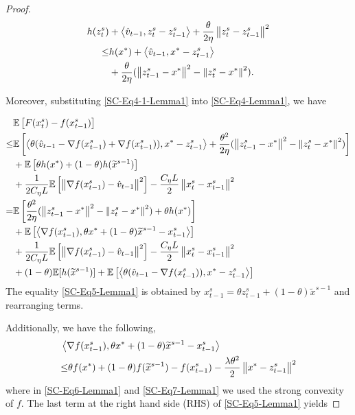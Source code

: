 \documentclass{article}
\newcommand*{\E}{\mathbb{E}}
\newcommand{\norm}[1]{\left\lVert#1\right\rVert}
\newcommand{\Iprod}[2]{\left\langle #1,#2\right\rangle}
\theoremstyle{definition}
\theoremstyle{remark}
\begin{document}
{\begin{proof}
\begin{align}
h(z_{t}^s) &+ \Iprod{\hat{v}_{t-1}}{z_{t}^s-z_{t-1}^s}+{\frac{\theta}{2\eta}}\norm{z_{t}^s-z_{t-1}^s}^2  \notag\\
\leq& h(x^*)+\Iprod{\hat{v}_{t-1}}{x^* - z_{t-1}^s}\notag\\
&+{\frac{\theta}{2\eta}}(\norm{z_{t-1}^s-x^*}^2-\norm{z_{t}^s-x^*}^2)\label{SC-Eq4-1-Lemma1}.  
\end{align}

Moreover, substituting \eqref{SC-Eq4-1-Lemma1} into  \eqref{SC-Eq4-Lemma1}, we have

\begin{align}
&\E\left[F(x_{t}^s) -f(x_{t-1}^s)\right]\notag\\
{\leq}&\E\left[\Iprod{\theta(\hat{v}_{t-1}-\nabla f(x_{t-1}^s)+\nabla f(x_{t-1}^s))}{x^* - z_{t-1}^s}+{\frac{\theta^2}{2\eta}}(\norm{z_{t-1}^s-x^*}^2-\norm{z_{t}^s-x^*}^2)\right]\notag\\
&+\E\left[\theta h(x^*)+(1-\theta) h(\widetilde{x}^{s-1})\right]\notag\\
&+\frac{1}{2C_{\eta} L}\E\left[\norm{\nabla f(x_{t-1}^s)-\hat{v}_{t-1}}^2\right]-\frac{C_{\eta} L}{2}\norm{x_{t}^s-x_{t-1}^s}^2\\
 =& \E\left[{\frac{ \theta^2}{2\eta}}(\norm{z_{t-1}^s-x^*}^2-\norm{z_{t}^s-x^*}^2)+\theta h(x^*)\right]\notag\\
&+\E\left[\Iprod{\nabla f(x_{t-1}^s)}{\theta x^*+(1-\theta)\widetilde{x}^{s-1}-{x}^{s}_{t-1}}\right]\notag\\
&+\frac{1}{2C_{\eta} L}\E\left[\norm{\nabla f(x_{t-1}^s)-\hat{v}_{t-1}}^2\right]-\frac{C_{\eta} L}{2}\norm{x_{t}^s-x_{t-1}^s}^2\notag\\
&+(1-\theta) \E[h(\widetilde{x}^{s-1})]+\E\left[\Iprod{\theta(\hat{v}_{t-1}-\nabla f(x_{t-1}^s))}{x^* - z_{t-1}^s}\right]\label{SC-Eq5-Lemma1}
\raisetag{18pt}
\end{align}
The equality \eqref{SC-Eq5-Lemma1} is obtained by $x_{t-1}^s = \theta z_{t-1}^s+(1-\theta)\widetilde{x}^{s-1}$ and rearranging terms. 

Additionally, we have the following,
\begin{align}
&\Iprod{\nabla f(x_{t-1}^s)}{\theta x^*+(1-\theta)\widetilde{x}^{s-1}-{x}^{s}_{t-1}}\notag\\
&{\leq} \theta f(x^*)+(1-\theta)f(\widetilde{x}^{s-1})-f(x_{t-1}^s)-\frac{\lambda\theta^2}{2}\norm{x^*-z_{t-1}^s}^2\label{SC-Eq7-Lemma1}
\end{align}
where in \eqref{SC-Eq6-Lemma1} and \eqref{SC-Eq7-Lemma1} we used the strong convexity of $f$. The last term at the right hand side (RHS) of \eqref{SC-Eq5-Lemma1} yields


\end{proof}}
\end{document}
